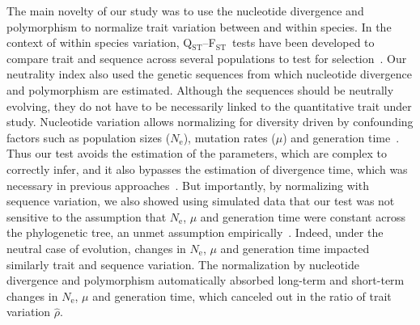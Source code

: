 \documentclass{article}
\newcommand{\Qst}{Q$_\text{ST}$}
\newcommand{\Fst}{F$_\text{ST}$}
\newcommand{\QstFst}{\Qst--\Fst}
\newcommand{\Ne}{N_{\text{e}}}
\newcommand{\MutationRate}{\mu}
\newcommand{\EstNI}{\widehat{\rho}}
\begin{document}
The main novelty of our study was to use the nucleotide divergence and polymorphism to normalize trait variation between and within species.
In the context of within species variation, \QstFst\ tests have been developed to compare trait and sequence across several populations to test for selection~\parencite{martin_multivariate_2008, leinonen_qst_2013}.
Our neutrality index also used the genetic sequences from which nucleotide divergence and polymorphism are estimated.
Although the sequences should be neutrally evolving, they do not have to be necessarily linked to the quantitative trait under study.
Nucleotide variation allows normalizing for diversity driven by confounding factors such as population sizes ($\Ne$), mutation rates ($\MutationRate$) and generation time~\parencite{hansen_translating_1996, harmon_phylogenetic_2018}.
Thus our test avoids the estimation of the parameters, which are complex to correctly infer, and it also bypasses the estimation of divergence time, which was necessary in previous approaches~\parencite{walsh_evolution_2018}.
But importantly, by normalizing with sequence variation, we also showed using simulated data that our test was not sensitive to the assumption that $\Ne$, $\MutationRate$ and generation time were constant across the phylogenetic tree, an unmet assumption empirically~\parencite{bergeron_evolution_2023, wilder_contribution_2023}.
Indeed, under the neutral case of evolution, changes in $\Ne$, $\MutationRate$ and generation time impacted similarly trait and sequence variation.
The normalization by nucleotide divergence and polymorphism automatically absorbed long-term and short-term changes in $\Ne$, $\MutationRate$ and generation time, which canceled out in the ratio of trait variation $\EstNI$.
\end{document}
